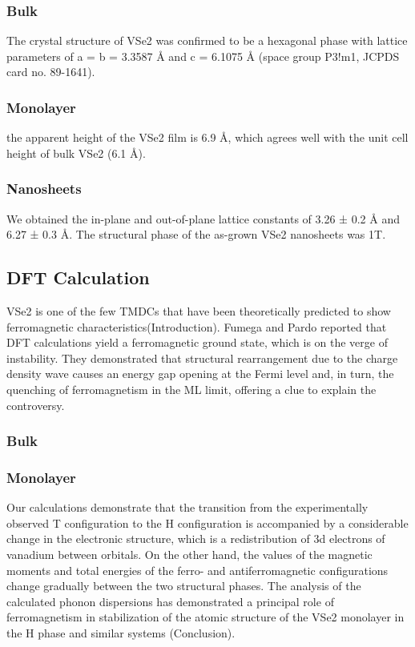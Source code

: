 \subsubsection{Bulk}
The crystal structure of VSe2 was confirmed to be a hexagonal phase with lattice parameters of a = b = 3.3587 Å and c = 6.1075 Å (space group P3!m1, JCPDS card no. 89-1641)\cite{C8NR09258C}.
\subsubsection{Monolayer}
the apparent height of the VSe2 film is 6.9 Å, which agrees well with the unit cell height of bulk VSe2 (6.1 Å).
\subsubsection{Nanosheets}
We obtained the in-plane and out-of-plane lattice constants of 3.26 ± 0.2 Å and 6.27 ± 0.3 Å. The structural phase of the as-grown VSe2 nanosheets was 1T\cite{C8NR09258C}.
\subsection{DFT Calculation}
VSe2 is one of the few TMDCs that have been theoretically predicted to show ferromagnetic characteristics\cite{C8NR09258C}(Introduction). Fumega and Pardo reported that DFT calculations yield a ferromagnetic ground state, which is on the verge of instability. They demonstrated that structural rearrangement due to the charge density wave causes an energy gap opening at the Fermi level and, in turn, the quenching of ferromagnetism in the ML limit, offering a clue to explain the controversy\cite{doi:10.1021/acsnano.9b02996}. 
\subsubsection{Bulk}

\subsubsection{Monolayer}
Our calculations demonstrate that the transition from the experimentally observed T configuration to the H configuration is accompanied by a considerable change in the electronic structure, which is a redistribution of 3d electrons of vanadium between orbitals. On the other hand, the values of the magnetic moments and total energies of the ferro- and antiferromagnetic configurations change gradually between the two structural phases. The analysis of the calculated phonon dispersions has demonstrated a principal role of ferromagnetism in stabilization of the atomic structure of the VSe2 monolayer in the H phase and similar systems \cite{C9CP03726H}(Conclusion).

